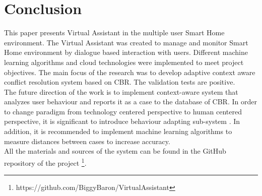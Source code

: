 \documentclass{llncs}
\begin{document}
    \section{Conclusion}
    This paper presents Virtual Assistant in the multiple user Smart Home environment.
    The Virtual Assistant was created
    to manage and monitor Smart Home environment by dialogue based interaction with users.
    Different machine learning
    algorithms and cloud technologies were implemented to meet project objectives.
    The main focus of the research was to
    develop adaptive context aware conflict resolution system based on CBR.
    The validation tests are positive.\\
    The future direction of the work is to implement context-aware system that analyzes user behaviour and reports it as
    a case to the database of CBR.
    In order to change paradigm from technology centered perspective to human centered perspective,
    it is significant to introduce behaviour adapting sub-system \cite{2}.
    In addition, it is recommended to implement machine learning algorithms to measure distances between cases to
    increase accuracy.\\
    All the materials and sources of the system can be found in the GitHub repository of the project \footnote{https://github.com/BiggyBaron/VirtualAssistant}.
\end{document}
